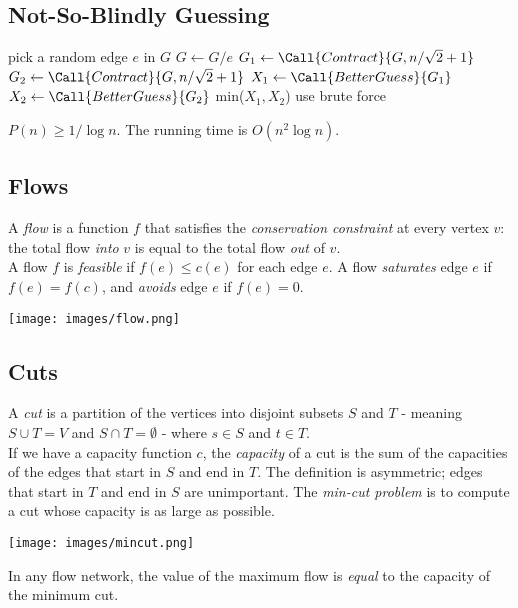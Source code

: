 \subsection{Not-So-Blindly Guessing}
\begin{algorithmic}[1]
			\State pick a random edge $e$ in $G$
			\State $G \gets G/e$
		\EndFor
	\EndFunction
			\State $G_1 \gets \Call{Contract}{G, n/\sqrt{2} + 1}$
			\State $G_2 \gets \Call{Contract}{G, n/\sqrt{2} + 1}$
			\State $X_1 \gets \Call{BetterGuess}{G_1}$
			\State $X_2 \gets \Call{BetterGuess}{G_2}$
			\State \Return min($X_1, X_2$)
		\Else
			\State use brute force
		\EndIf
	\EndFunction
\end{algorithmic}
$P(n) \geq 1/\log n$. The running time is $O(n^2 \log n)$.

\subsection{Flows}
A \emph{flow} is a function $f$ that satisfies the \emph{conservation constraint} at every vertex $v$: the total flow \emph{into} $v$ is equal to the total flow \emph{out} of $v$.\\

A flow $f$ is \emph{feasible} if $f(e) \leq c(e)$ for each edge $e$. A flow \emph{saturates} edge $e$ if $f(e) = f(c)$, and \emph{avoids} edge $e$ if $f(e) = 0$.

\texttt{[image: images/flow.png]}

\subsection{Cuts}
A \emph{cut} is a partition of the vertices into disjoint subsets $S$ and $T$ - meaning $S \cup T = V$ and $S \cap T = \emptyset$ - where $s \in S$ and $t \in T$.\\

If we have a capacity function $c$, the \emph{capacity} of a cut is the sum of the capacities of the edges that start in $S$ and end in $T$. The definition is asymmetric; edges that start in $T$ and end in $S$ are unimportant. The \emph{min-cut problem} is to compute a cut whose capacity is as large as possible.

\texttt{[image: images/mincut.png]}

\begin{theorem}
	In any flow network, the value of the maximum flow is \emph{equal} to the capacity of the minimum cut.
\end{theorem}

